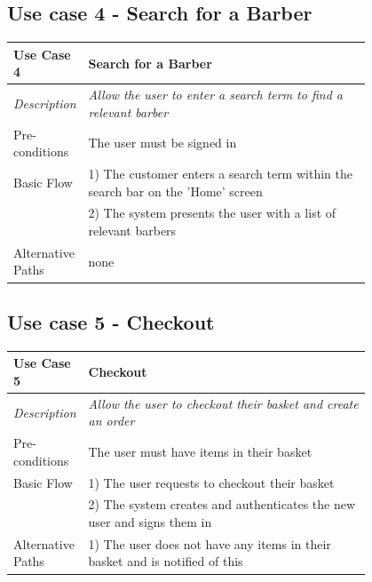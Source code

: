 \documentclass[12pt]{article}
\begin{document}
	\subsection{Use case 4 - Search for a Barber}
	\label{chap:use-cases-4}
	\begin{table}[H]
		\begin{tabular}{|l|p{0.8\linewidth}}
			\hline
			\rowcolor[HTML]{EFEFEF} 
			\textbf{Use Case 4}  & \textbf{Search for a Barber}                                                         \\ \hline
			\rowcolor[HTML]{F5FBFF} 
			\textit{Description} & \textit{Allow the user to enter a search term to find a relevant barber}                                  \\ \hline
			\rowcolor[HTML]{EFEFEF} 
			Pre-conditions       & The user must be signed in                                                      \\ \hline
			\rowcolor[HTML]{F5FBFF} 
			Basic Flow           & 1) The customer enters a search term within the search bar on the 'Home' screen \\
			\rowcolor[HTML]{F5FBFF} 
			& 2) The system presents the user with a list of relevant barbers                 \\ \hline
			\rowcolor[HTML]{EFEFEF} 
			Alternative Paths    & none                                                                           
		\end{tabular}
	\end{table}

	\subsection{Use case 5 - Checkout}
	\label{chap:use-cases-5}
	\begin{table}[H]
		\begin{tabular}{|l|p{0.8\linewidth}}
			\hline
			\rowcolor[HTML]{EFEFEF} 
			\textbf{Use Case 5}  & \textbf{Checkout}                                                           \\ \hline
			\rowcolor[HTML]{F5FBFF} 
			\textit{Description} & \textit{Allow the user to checkout their basket and create an order}        \\ \hline
			\rowcolor[HTML]{EFEFEF} 
			Pre-conditions       & The user must have items in their basket                                    \\ \hline
			\rowcolor[HTML]{F5FBFF} 
			Basic Flow           & 1) The user requests to checkout their basket                               \\
			\rowcolor[HTML]{F5FBFF} 
			& 2) The system creates and authenticates the new user and signs them in      \\ \hline
			\rowcolor[HTML]{EFEFEF} 
			Alternative Paths    & 1) The user does not have any items in their basket and is notified of this
		\end{tabular}
	\end{table}
	
\end{document}
